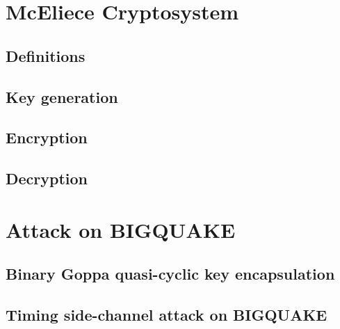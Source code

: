 \section{McEliece Cryptosystem}
\subsection{Definitions}
\subsection{Key generation}
\subsection{Encryption}
\subsection{Decryption}
\section{Attack on BIGQUAKE}
\subsection{Binary Goppa quasi-cyclic key encapsulation}
\subsection{Timing side-channel attack on BIGQUAKE}